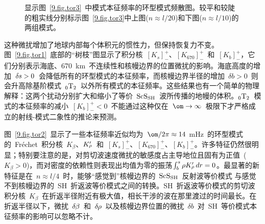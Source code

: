 \begin{figure}[!t]
\begin{center}
\end{center}
\caption[torkernels4]{\label{9.fig.tor4}
显示图~\ref{9.fig.tor3}~中模式本征频率的环型模式频散图。较平和较陡的粗实线分别标示图~\ref{9.fig.tor3}中上图($n\approx l/20$)和下图($n\approx l/10$)的两组模式。
}
\end{figure}
这种微扰增加了地球内部每个体积元的惯性力，但保持恢复力不变。图~\ref{9.fig.tor1}~底部的“树枝”图显示了积分核~$[K_s]^+_-$、$[K_{670}]^+_-$~和~$[K_b]^+_-$，它们分别表示海底、670~km~不连续性和核幔边界的位置微扰的影响。海底高度的增加~$\delta\hspace{-0.1 mm}s>0$~会降低所有的环型模式的本征频率，而核幔边界半径的增加~$\delta b>0$~则会升高除基阶模式~${}_0{\rm T}_2$~以外所有模式的本征频率。这些结果也有一个简单的物理解释：这两个扰动分别扩大和缩小了等价~${\rm ScS}_{\rm SH}$~波所传播的地幔的体积。${}_0{\rm T}_2$~模式的本征频率的减小~$[K_b]^+_-<0$~不能通过这种仅在~$\om\rightarrow\infty$\vspace{-0.5mm}~极限下才严格成立的射线-模式二象性的推论来预测。

图~\ref{9.fig.tor2}~显示了一些本征频率近似均为~$\om/2\pi\approx 14$ mHz~的环型模式的~Fr\'{e}chet~积分核~$K_{\beta}$、$K_{\raisebox{0.3 ex}{\scriptsize$\rho$}}^{\prime}$~和~$[K_s]^+_-$、$[K_{670}]^+_-$、$[K_b]^+_-$。许多特征仍然很明显；特别要注意的是，对剪切波速度微扰的敏感度占主导地位且固有为正值~($K_{\beta}>0$)，而对密度的依赖性则表现出均值为零的振荡$\int_b^s\rho K_{\raisebox{0.3 ex}{\scriptsize$\rho$}}^{\prime}\,dr=0$。最显著的新特征是在~$n\approx l/4$~时，能够“感觉到”核幔边界的~${\rm ScS}_{\rm SH}$~反射波等价模式
与感觉不到核幔边界的~SH~折返波等价模式之间的转换。SH~折返波等价模式的剪切波积分核~$K_{\beta}$~在折返半径附近有极大值，相长干涉的波在那里渡过的时间最长。在折返半径以下，微扰~$\delta\hspace{-0.2 mm}\beta$~和~$\delta\hspace{-0.2 mm}\rho$~以及核幔边界位置的微扰~$\delta b$~对~SH~等价模式本征频率的影响可以忽略不计。

